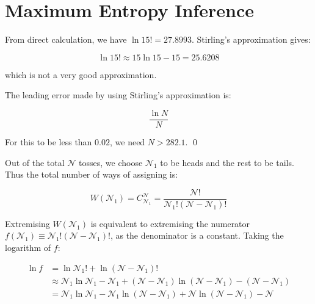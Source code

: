 \documentclass[12pt]{article}
\begin{document}



\pagebreak
\section*{Maximum Entropy Inference}


From direct calculation, we have $\ln{15!} = 27.8993$. Stirling's approximation gives:

\begin{equation}
    \ln{15!} \approx 15\ln{15} - 15 = 25.6208
\end{equation}

which is not a very good approximation.

The leading error made by using Stirling's approximation is:

\begin{equation}
    \frac{\ln{N}}{N}
\end{equation}

For this to be less than $0.02$, we need $N > 282.1$.
\qed



Out of the total $\mathcal{N}$ tosses, we choose $\mathcal{N}_1$ to be heads and the rest to be tails. Thus the total number of ways of assigning is:

\begin{equation}
    W(\mathcal{N}_{1}) = C_{\mathcal{N}_{1}}^{\mathcal{N}} = \frac{\mathcal{N}!}{\mathcal{N}_{1}!(\mathcal{N} - \mathcal{N}_{1})!}
\end{equation}

Extremising $W(\mathcal{N}_{1})$ is equivalent to extremising the numerator $f(\mathcal{N}_{1}) \equiv \mathcal{N}_{1}!(\mathcal{N} - \mathcal{N}_{1})!$, as the denominator is a constant. Taking the logarithm of $f$:

\begin{equation}
    \begin{split}
        \ln{f} &= \ln{\mathcal{N}_{1}!} + \ln{(\mathcal{N} - \mathcal{N}_{1})!} \\
        &\approx \mathcal{N}_{1} \ln{\mathcal{N}_{1}} - \mathcal{N}_{1} + (\mathcal{N} - \mathcal{N}_{1}) \ln{(\mathcal{N} - \mathcal{N}_{1})} - (\mathcal{N} - \mathcal{N}_{1}) \\
        &= \mathcal{N}_{1} \ln{\mathcal{N}_{1}} - \mathcal{N}_{1} \ln{(\mathcal{N} - \mathcal{N}_{1})} + \mathcal{N} \ln{(\mathcal{N} - \mathcal{N}_{1})} - \mathcal{N}
    \end{split}
\end{equation}
\end{document}
